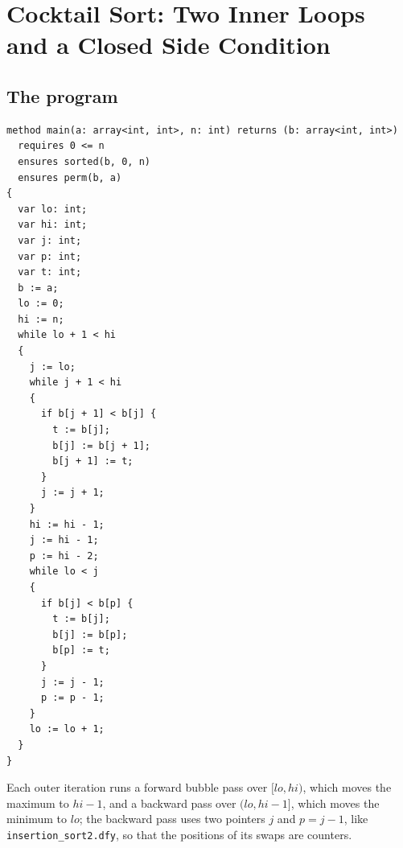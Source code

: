 \section{Cocktail Sort: Two Inner Loops and a Closed Side Condition}\label{sec:cock}

\subsection{The program}
\begin{lstlisting}
method main(a: array<int, int>, n: int) returns (b: array<int, int>)
  requires 0 <= n
  ensures sorted(b, 0, n)
  ensures perm(b, a)
{
  var lo: int;
  var hi: int;
  var j: int;
  var p: int;
  var t: int;
  b := a;
  lo := 0;
  hi := n;
  while lo + 1 < hi
  {
    j := lo;
    while j + 1 < hi
    {
      if b[j + 1] < b[j] {
        t := b[j];
        b[j] := b[j + 1];
        b[j + 1] := t;
      }
      j := j + 1;
    }
    hi := hi - 1;
    j := hi - 1;
    p := hi - 2;
    while lo < j
    {
      if b[j] < b[p] {
        t := b[j];
        b[j] := b[p];
        b[p] := t;
      }
      j := j - 1;
      p := p - 1;
    }
    lo := lo + 1;
  }
}
\end{lstlisting}
Each outer iteration runs a forward bubble pass over $[lo, hi)$, which moves the maximum to $hi - 1$, and a
backward pass over $(lo, hi - 1]$, which moves the minimum to $lo$; the backward pass uses two pointers
$j$ and $p = j - 1$, like \texttt{insertion\_sort2.dfy}, so that the positions of its swaps are counters.

